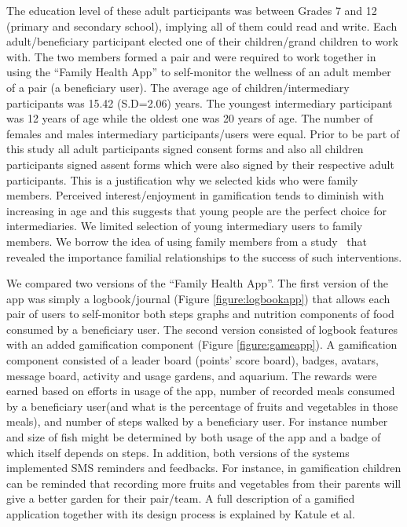 \documentclass{sig-alternate}
\begin{document}
The education level of these adult participants was between Grades 7 and 12 (primary and secondary school), implying all of them could read and write. Each adult/beneficiary participant  elected one of their children/grand children to work with. The two members formed a pair and were required to work together in using the ``Family Health App'' to self-monitor the wellness of an adult member of a pair (a beneficiary user). The average age of children/intermediary participants was 15.42 (S.D=2.06) years. The youngest intermediary participant was 12 years of age while the oldest one was 20 years of age. The number of females and males intermediary participants/users were equal. Prior to be part of this study all adult participants signed consent forms and also all children participants signed assent forms which were also signed by their respective adult participants. This is a justification why we selected kids who were family members. Perceived interest/enjoyment in gamification tends to diminish with increasing in age \cite{v2014motivational} and this suggests that young people are the perfect choice for intermediaries. We limited selection of young intermediary users to family members. We borrow the idea of using family members from a study~\cite{katule2016:leveraging} that revealed the importance familial relationships to the success of such interventions.

We compared two versions of the ``Family Health App''. The first version of the app was simply a logbook/journal (Figure \ref{figure:logbookapp}) that allows each pair of users to self-monitor both steps graphs and nutrition components of food consumed by a beneficiary user. The second version consisted of logbook features with an added gamification component (Figure \ref{figure:gameapp}). A gamification component consisted of a leader board (points' score board), badges, avatars, message board, activity and usage gardens, and aquarium. The rewards were earned based on efforts in usage of the app, number of recorded meals consumed by a beneficiary user(and what is the percentage of fruits and vegetables in those meals), and number of steps walked by a beneficiary user. For instance  number and size of fish might be determined by both usage of the app and a badge of which itself depends on steps.  In addition, both versions of the systems implemented SMS reminders and feedbacks. For instance, in gamification children can be reminded that recording more fruits and vegetables from their parents will give a better garden for their pair/team. A full description of a gamified application together with its design process is explained by Katule et al.~\cite{katule2016:leveraging}
\end{document}
